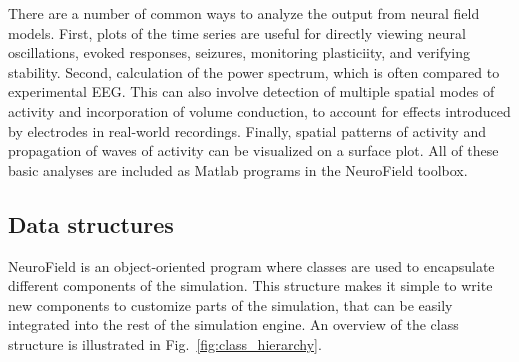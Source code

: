 \documentclass[preprint,review,10pt,authoryear,letterpaper]{elsarticle}
\begin{document}
There are a number of common ways to analyze the output from neural field models. First, plots of the time series are useful for directly viewing neural oscillations, evoked responses, seizures, monitoring plasticiity, and verifying stability. Second, calculation of the power spectrum, which is often compared to experimental EEG. This can also involve detection of multiple spatial modes of activity and incorporation of volume conduction, to account for effects introduced by electrodes in real-world recordings. Finally, spatial patterns of activity and propagation of waves of activity can be visualized on a surface plot. All of these basic analyses are included as Matlab programs in the NeuroField toolbox. 

\subsection{Data structures}
NeuroField is an object-oriented program where classes are used to encapsulate different components of the simulation. This structure makes it simple to write new components to customize parts of the simulation, that can be easily integrated into the rest of the simulation engine. An overview of the class structure is illustrated in Fig.~\ref{fig:class_hierarchy}. 
\end{document}

